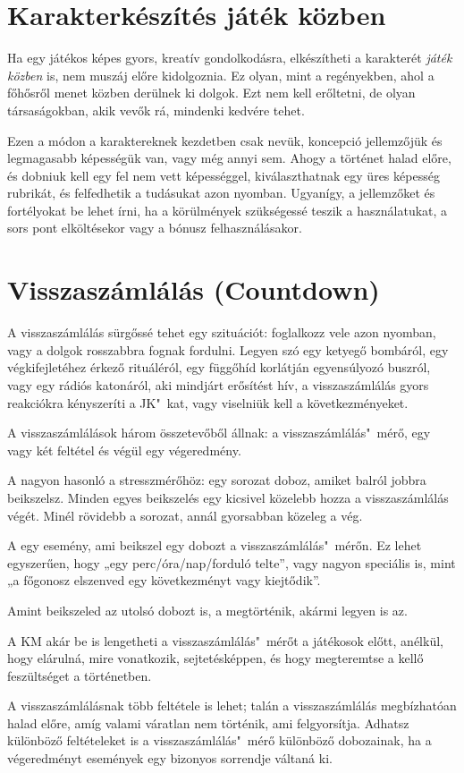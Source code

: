 \label{Karakterkészítés játék közben}
\section{Karakterkészítés játék közben}

Ha egy játékos képes gyors, kreatív gondolkodásra, elkészítheti a karakterét \emph{játék közben} is, nem muszáj előre kidolgoznia. Ez olyan, mint a regényekben, ahol a főhősről menet közben derülnek ki dolgok. Ezt nem kell erőltetni, de olyan társaságokban, akik vevők rá, mindenki kedvére tehet.

Ezen a módon a karaktereknek kezdetben csak nevük, koncepció jellemzőjük és legmagasabb képességük van, vagy még annyi sem. Ahogy a történet halad előre, és dobniuk kell egy fel nem vett képességgel, kiválaszthatnak egy üres képesség rubrikát, és felfedhetik a tudásukat azon nyomban. Ugyanígy, a jellemzőket és fortélyokat be lehet írni, ha a körülmények szükségessé teszik a használatukat, a sors pont elköltésekor vagy a bónusz felhasználásakor.

\label{Visszaszámlálás}
\section[Visszaszámlálás]{Visszaszámlálás (Countdown)}

A visszaszámlálás sürgőssé tehet egy szituációt: foglalkozz vele azon nyomban, vagy a dolgok rosszabbra fognak fordulni. Legyen szó egy ketyegő bombáról, egy végkifejletéhez érkező rituáléról, egy függőhíd korlátján egyensúlyozó buszról, vagy egy rádiós katonáról, aki mindjárt erősítést hív, a visszaszámlálás gyors reakciókra kényszeríti a JK"~kat, vagy viselniük kell a következményeket.

A visszaszámlálások három összetevőből állnak: a visszaszámlálás"~mérő, egy vagy két feltétel és végül egy végeredmény.

A  nagyon hasonló a stresszmérőhöz: egy sorozat doboz, amiket balról jobbra beikszelsz. Minden egyes beikszelés egy kicsivel közelebb hozza a visszaszámlálás végét. Minél rövidebb a sorozat, annál gyorsabban közeleg a vég.

A  egy esemény, ami beikszel egy dobozt a visszaszámlálás"~mérőn. Ez lehet egyszerűen, hogy „egy perc/óra/nap/forduló telte”, vagy nagyon speciális is, mint „a főgonosz elszenved egy következményt vagy kiejtődik”.

Amint beikszeled az utolsó dobozt is, a  megtörténik, akármi legyen is az.

A KM akár be is lengetheti a visszaszámlálás"~mérőt a játékosok előtt, anélkül, hogy elárulná, mire vonatkozik, sejtetésképpen, és hogy megteremtse a kellő feszültséget a történetben.

A visszaszámlálásnak több feltétele is lehet; talán a visszaszámlálás megbízhatóan halad előre, amíg valami váratlan nem történik, ami felgyorsítja. Adhatsz különböző feltételeket is a visszaszámlálás"~mérő különböző dobozainak, ha a végeredményt események egy bizonyos sorrendje váltaná ki.
